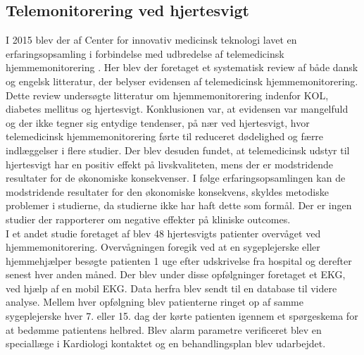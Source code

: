 \subsection{Telemonitorering ved hjertesvigt} \label{telemonitoreringhjertesvigt}
I 2015 blev der af Center for innovativ medicinsk teknologi lavet en erfaringsopsamling i forbindelse med udbredelse af telemedicinsk hjemmemonitorering \citep{erfaringsopsamlingTelemedicin}. Her blev der foretaget et systematisk review af både dansk og engelsk litteratur, der belyser evidensen af telemedicinsk hjemmemonitorering. Dette review undersøgte litteratur om hjemmemonitorering indenfor KOL, diabetes mellitus og hjertesvigt. Konklusionen var, at evidensen var mangelfuld og der ikke tegner sig entydige tendenser, på nær ved hjertesvigt, hvor telemedicinsk hjemmemonitorering førte til reduceret dødelighed og færre indlæggelser i flere studier. Der blev desuden fundet, at telemedicinsk udstyr til hjertesvigt har en positiv effekt på livskvaliteten, mens der er modstridende resultater for de økonomiske konsekvenser. I følge erfaringsopsamlingen kan de modstridende resultater for den økonomiske konsekvens, skyldes metodiske problemer i studierne, da studierne ikke har haft dette som formål. Der er ingen studier der rapporterer om negative effekter på kliniske outcomes. \citep{erfaringsopsamlingTelemedicin}\\
I et andet studie foretaget af \citet{teleprog} blev 48 hjertesvigts patienter overvåget ved hjemmemonitorering. Overvågningen foregik ved at en sygeplejerske eller hjemmehjælper besøgte patienten 1 uge efter udskrivelse fra hospital og derefter senest hver anden måned. Der blev under disse opfølgninger foretaget et EKG, ved hjælp af en mobil EKG. Data herfra blev sendt til en database til videre analyse. Mellem hver opfølgning blev patienterne ringet op af samme sygeplejerske hver 7. eller 15. dag der kørte patienten igennem et spørgeskema for at bedømme patientens helbred. Blev alarm parametre verificeret blev en speciallæge i Kardiologi kontaktet og en behandlingsplan blev udarbejdet. \citep{teleprog} 
